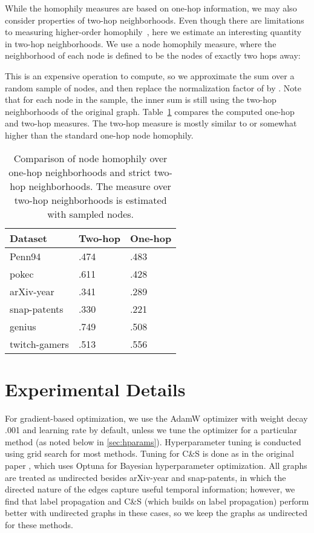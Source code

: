 \documentclass{article}
\begin{document}
While the homophily measures are based on one-hop information, we may also consider properties of two-hop neighborhoods. Even though there are limitations to measuring higher-order homophily~\cite{veldt2021higher}, here we estimate an interesting quantity in two-hop neighborhoods. We use a node homophily measure, where the neighborhood of each node is defined to be the nodes of exactly two hops away:

This is an expensive operation to compute, so we approximate the sum over a random sample of  nodes, and then replace the normalization factor of  by . Note that for each node  in the sample, the inner sum is still using the two-hop neighborhoods of the original graph.  Table~\ref{tab:two-hop} compares the computed one-hop and two-hop measures. The two-hop measure is mostly similar to or somewhat higher than the standard one-hop node homophily.
\begin{table}[ht]
    \centering
    \caption{Comparison of node homophily over one-hop neighborhoods and strict two-hop neighborhoods. The measure over two-hop neighborhoods is estimated with  sampled nodes.}
    \label{tab:two-hop}
    \begin{tabular}{lll}
    \toprule 
         Dataset & Two-hop & One-hop  \\
         \midrule
         Penn94 & .474 & .483 \\
         pokec & .611 & .428 \\
         arXiv-year & .341 & .289\\
         snap-patents & .330 & .221\\
         genius & .749 & .508\\
         twitch-gamers & .513 & .556\\
         \bottomrule
    \end{tabular}
\end{table}

\section{Experimental Details}\label{sec:exp_details}

For gradient-based optimization, we use the AdamW optimizer \cite{kingma2014adam, loshchilov2018decoupled} with weight decay .001  and learning rate  by default, unless we tune the optimizer for a particular method (as noted below in \ref{sec:hparams}).  Hyperparameter tuning is conducted using grid search for most methods. Tuning for C\&S is done as in the original paper \cite{huang2021combining}, which uses Optuna \cite{optuna} for Bayesian hyperparameter optimization. All graphs are treated as undirected besides arXiv-year and snap-patents, in which the directed nature of the edges capture useful temporal information; however, we find that label propagation and C\&S (which builds on label propagation) perform better with undirected graphs in these cases, so we keep the graphs as undirected for these methods. 
\end{document}
